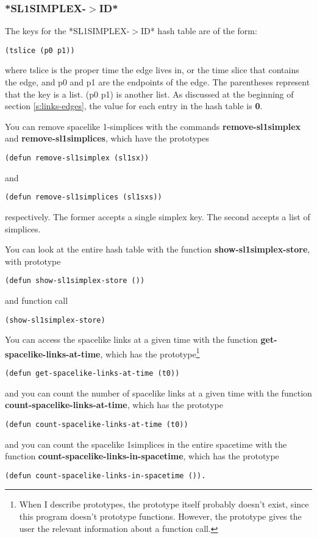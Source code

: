 \message{ !name(programmers_guide.tex)}\documentclass[12pt]{article}
\begin{document}
\subsubsection{*SL1SIMPLEX-$>$ID*}
\label{sss:sl1simplex:id}
The keys for the *SL1SIMPLEX-$>$ID* hash table are of the form:
\begin{lstlisting}
(tslice (p0 p1))
\end{lstlisting}
where tslice is the proper time the edge lives in, or the time slice
that contains the edge, and p0 and p1 are the endpoints of the
edge. The parentheses represent that the key is a list. (p0 p1) is
another list. As discussed at the beginning of section
\ref{s:links-edges}, the value for each entry in the hash table is
\textbf{0}.

You can remove spacelike 1-simplices with the commands
\textbf{remove-sl1simplex} and \textbf{remove-sl1simplices}, which
have the prototypes
\begin{lstlisting}
(defun remove-sl1simplex (sl1sx))
\end{lstlisting}
and 
\begin{lstlisting}
(defun remove-sl1simplices (sl1sxs))
\end{lstlisting}
respectively. The former accepts a single simplex key. The second
accepts a list of simplices.

You can look at the entire hash table with the function
\textbf{show-sl1simplex-store}, with prototype
\begin{lstlisting}
(defun show-sl1simplex-store ())
\end{lstlisting}
and function call
\begin{lstlisting}
(show-sl1simplex-store)
\end{lstlisting}

You can access the spacelike links at a given time with the function
\textbf{get-spacelike-links-at-time}, which has the
prototype\footnote{When I describe prototypes, the prototype itself
  probably doesn't exist, since this program doesn't prototype
  functions. However, the prototype gives the user the relevant
  information about a function call.}
\begin{lstlisting}
(defun get-spacelike-links-at-time (t0))
\end{lstlisting}
and you can count the number of spacelike links at a given time with
the function \textbf{count-spacelike-links-at-time}, which has the
prototype
\begin{lstlisting}
(defun count-spacelike-links-at-time (t0))
\end{lstlisting}
and you can count the spacelike 1simplices in the entire spacetime
with the function \textbf{count-spacelike-links-in-spacetime}, which
has the prototype
\begin{lstlisting}
(defun count-spacelike-links-in-spacetime ()).
\end{lstlisting}
\end{document}
